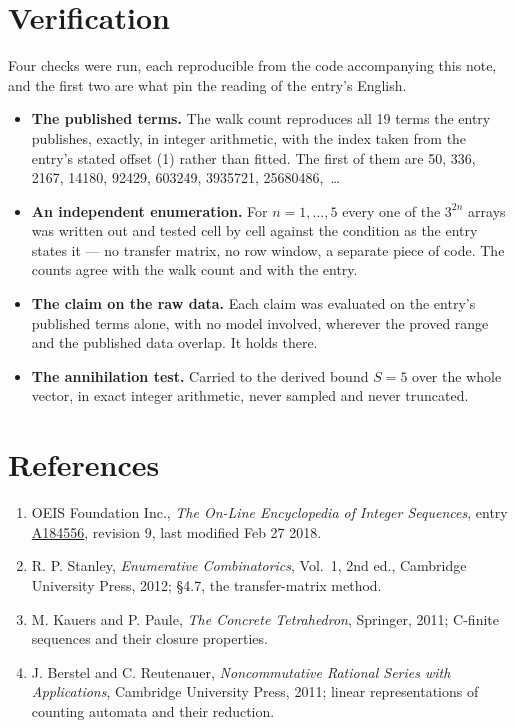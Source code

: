 \documentclass[11pt]{article}
\theoremstyle{definition}
\begin{document}
\section{Verification}

Four checks were run, each reproducible from the code accompanying this note, and the first two are what pin the reading of the entry's English.

\begin{itemize}

\item {\bfseries The published terms.} The walk count reproduces all 19 terms the entry publishes, exactly, in integer arithmetic, with the index taken from the entry's stated offset (1) rather than fitted. The first of them are 50, 336, 2167, 14180, 92429, 603249, 3935721, 25680486,~\dots

\item {\bfseries An independent enumeration.} For $n = 1,\dots,5$ every one of the $3^{2n}$ arrays was written out and tested cell by cell against the condition as the entry states it --- no transfer matrix, no row window, a separate piece of code. The counts agree with the walk count and with the entry.

\item {\bfseries The claim on the raw data.} Each claim was evaluated on the entry's published terms alone, with no model involved, wherever the proved range and the published data overlap. It holds there.

\item {\bfseries The annihilation test.} Carried to the derived bound $S = 5$ over the whole vector, in exact integer arithmetic, never sampled and never truncated.

\end{itemize}

\section{References}

\begin{enumerate}

\item OEIS Foundation Inc., \emph{The On-Line Encyclopedia of Integer Sequences}, entry \href{https://oeis.org/A184556}{A184556}, revision 9, last modified Feb 27 2018.

\item R. P. Stanley, \emph{Enumerative Combinatorics}, Vol.~1, 2nd ed., Cambridge University Press, 2012; \S4.7, the transfer-matrix method.

\item M. Kauers and P. Paule, \emph{The Concrete Tetrahedron}, Springer, 2011; C-finite sequences and their closure properties.

\item J. Berstel and C. Reutenauer, \emph{Noncommutative Rational Series with Applications}, Cambridge University Press, 2011; linear representations of counting automata and their reduction.

\end{enumerate}
\end{document}
